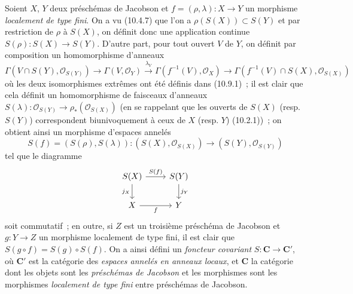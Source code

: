 \begin{env}[10.9.2]
\label{IV.10.9.2-fr}
Soient $X$, $Y$ deux préschémas de Jacobson et
$f=(\rho,\lambda):X\to Y$ un morphisme \emph{localement de type fini}. On a vu
(10.4.7) que l'on a $\rho(S(X))\subset S(Y)$ et par restriction de $\rho$ à
$S(X)$, on définit donc une application continue $S(\rho):S(X)\to S(Y)$.
D'autre part, pour tout ouvert $V$ de $Y$, on définit par composition un
homomorphisme d'anneaux
\[
  \Gamma(V\cap S(Y),\mathcal O_{S(Y)})\longrightarrow
  \Gamma(V,\mathcal O_Y)\xrightarrow{\lambda_V}
  \Gamma(f^{-1}(V),\mathcal O_X)\longrightarrow
  \Gamma(f^{-1}(V)\cap S(X),\mathcal O_{S(X)})
\]
où les deux isomorphismes extrêmes ont été définis dans (10.9.1)~; il est clair
que cela définit un homomorphisme de faisceaux d'anneaux
$S(\lambda):\mathcal O_{S(Y)}\to\rho_*(\mathcal O_{S(X)})$ (en se rappelant
que les ouverts de $S(X)$ (resp. $S(Y)$) correspondent biunivoquement à ceux de
$X$ (resp. $Y$) (10.2.1))~; on obtient ainsi un morphisme d'espaces annelés
\[
  S(f)=(S(\rho),S(\lambda)):(S(X),\mathcal O_{S(X)})\longrightarrow
  (S(Y),\mathcal O_{S(Y)})
\]
tel que le diagramme
\[
\begin{tikzcd}
S(X) \ar[r,"S(f)"] \ar[d,"j_X"'] & S(Y) \ar[d,"j_Y"] \\
X \ar[r,"f"'] & Y
\end{tikzcd}
\]
soit commutatif~; en outre, si $Z$ est un troisième préschéma de Jacobson et
$g:Y\to Z$ un morphisme localement de type fini, il est clair que
$S(g\circ f)=S(g)\circ S(f)$. On a ainsi défini un \emph{foncteur covariant}
$S:\mathbf C\to\mathbf C'$, où $\mathbf C'$ est la catégorie des \emph{espaces
annelés en anneaux locaux}, et $\mathbf C$ la catégorie dont les objets sont les
\emph{préschémas de Jacobson} et les morphismes sont les morphismes
\emph{localement de type fini} entre préschémas de Jacobson.
\end{env}

